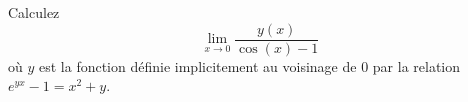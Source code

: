 
\begin{exercice}\label{exoImplicite0005}

Calculez
\[
\lim_{x \rightarrow 0} \frac{y(x)}{\cos(x)-1}
\]
où $y$ est la fonction définie implicitement au voisinage de $0$
par la relation $e^{yx} - 1 = x^2 + y$.

\end{exercice}
